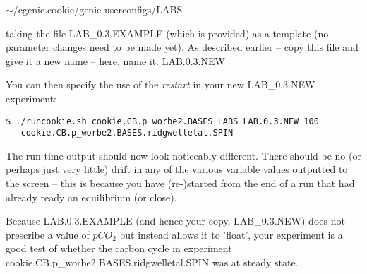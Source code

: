 \vspace{1mm}
\textsf{\footnotesize \(\sim\)/cgenie.cookie/genie-userconfigs/LABS}
\vspace{1mm}

\noindent taking the file \textsf{\footnotesize LAB\_0.3.EXAMPLE} (which is provided) as a template (no parameter changes need to be made yet). As described earlier -- copy this file and give it a new name -- here, name it: \textsf{\footnotesize LAB.0.3.NEW}

\newpage

\noindent You can then specify the use of the \textit{restart} in your new \textsf{\footnotesize LAB\_0.3.NEW} experiment:

\vspace{-2mm}
\small\begin{verbatim}
$ ./runcookie.sh cookie.CB.p_worbe2.BASES LABS LAB.0.3.NEW 100 
   cookie.CB.p_worbe2.BASES.ridgwelletal.SPIN
\end{verbatim}\normalsize
\vspace{-2mm}

The run-time output should now look noticeably different. There should be no (or perhaps just very little) drift in any of the various variable values outputted to the screen – this is because you have (re-)started from the end of a run that had already ready an equilibrium (or close).

Because \textsf{\footnotesize LAB.0.3.EXAMPLE} (and hence your copy, \textsf{\footnotesize LAB\_0.3.NEW}) does not prescribe a value of $pCO_2$ but instead allows it to 'float', your experiment is a good test of whether the carbon cycle in experiment \\\textsf{\footnotesize cookie.CB.p\_worbe2.BASES.ridgwelletal.SPIN} was at steady state.

